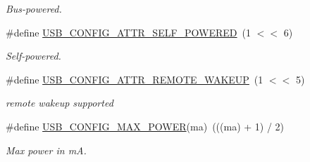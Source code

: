 \begin{DoxyCompactItemize}
\begin{DoxyCompactList}\small\item\em Bus-\/powered. \end{DoxyCompactList}\item 
\hypertarget{group__usb__protocol__group_gaf1b445db8c331630bbedb383544ed80b}{\#define \hyperlink{group__usb__protocol__group_gaf1b445db8c331630bbedb383544ed80b}{U\-S\-B\-\_\-\-C\-O\-N\-F\-I\-G\-\_\-\-A\-T\-T\-R\-\_\-\-S\-E\-L\-F\-\_\-\-P\-O\-W\-E\-R\-E\-D}~(1 $<$$<$ 6)}\label{group__usb__protocol__group_gaf1b445db8c331630bbedb383544ed80b}

\begin{DoxyCompactList}\small\item\em Self-\/powered. \end{DoxyCompactList}\item 
\hypertarget{group__usb__protocol__group_gab8f513d1888f75d8e18960e1b1f3f747}{\#define \hyperlink{group__usb__protocol__group_gab8f513d1888f75d8e18960e1b1f3f747}{U\-S\-B\-\_\-\-C\-O\-N\-F\-I\-G\-\_\-\-A\-T\-T\-R\-\_\-\-R\-E\-M\-O\-T\-E\-\_\-\-W\-A\-K\-E\-U\-P}~(1 $<$$<$ 5)}\label{group__usb__protocol__group_gab8f513d1888f75d8e18960e1b1f3f747}

\begin{DoxyCompactList}\small\item\em remote wakeup supported \end{DoxyCompactList}\item 
\hypertarget{group__usb__protocol__group_ga55d9db758a4f408eebf4b26c6001ac9b}{\#define \hyperlink{group__usb__protocol__group_ga55d9db758a4f408eebf4b26c6001ac9b}{U\-S\-B\-\_\-\-C\-O\-N\-F\-I\-G\-\_\-\-M\-A\-X\-\_\-\-P\-O\-W\-E\-R}(ma)~(((ma) + 1) / 2)}\label{group__usb__protocol__group_ga55d9db758a4f408eebf4b26c6001ac9b}

\begin{DoxyCompactList}\small\item\em Max power in m\-A. \end{DoxyCompactList}\end{DoxyCompactItemize}
